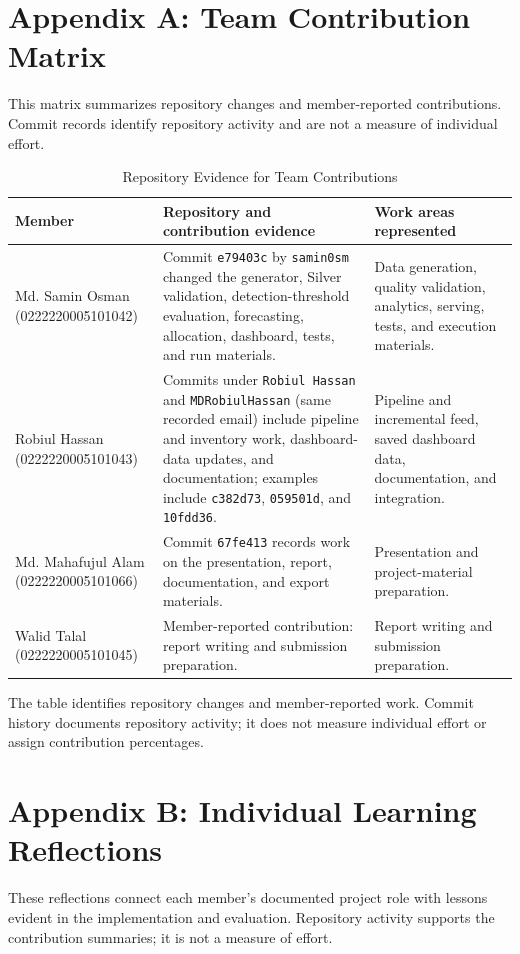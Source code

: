 \documentclass[conference]{IEEEtran}
\begin{document}
\appendices

\section*{Appendix A: Team Contribution Matrix}
This matrix summarizes repository changes and member-reported contributions. Commit records identify repository activity and are not a measure of individual effort.

\begin{table}[htbp]
\caption{Repository Evidence for Team Contributions}
\centering\small
\renewcommand{\arraystretch}{1.18}
\begin{tabularx}{\textwidth}{p{3.0cm}X p{5.0cm}}
\toprule
Member & Repository and contribution evidence & Work areas represented \\
\midrule

Md. Samin Osman (0222220005101042) & Commit \texttt{e79403c} by \texttt{samin0sm} changed the generator, Silver validation, detection-threshold evaluation, forecasting, allocation, dashboard, tests, and run materials. & Data generation, quality validation, analytics, serving, tests, and execution materials. \\
Robiul Hassan (0222220005101043) & Commits under \texttt{Robiul Hassan} and \texttt{MDRobiulHassan} (same recorded email) include pipeline and inventory work, dashboard-data updates, and documentation; examples include \texttt{c382d73}, \texttt{059501d}, and \texttt{10fdd36}. & Pipeline and incremental feed, saved dashboard data, documentation, and integration. \\
Md. Mahafujul Alam (0222220005101066) & Commit \texttt{67fe413} records work on the presentation, report, documentation, and export materials. & Presentation and project-material preparation. \\
Walid Talal (0222220005101045) & Member-reported contribution: report writing and submission preparation. & Report writing and submission preparation. \\
\bottomrule
\end{tabularx}
\end{table}

The table identifies repository changes and member-reported work. Commit history documents repository activity; it does not measure individual effort or assign contribution percentages.

\FloatBarrier
\section*{Appendix B: Individual Learning Reflections}
These reflections connect each member's documented project role with lessons evident in the implementation and evaluation. Repository activity supports the contribution summaries; it is not a measure of effort.
\setlength{\parskip}{0.35em}
\end{document}
